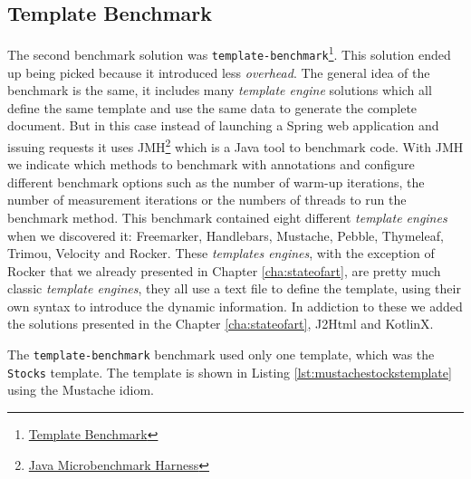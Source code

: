 \subsection{Template Benchmark}
\label{sec:templatebenchmark}

The second benchmark solution was \texttt{template-benchmark}\footnote{\href{https://github.com/mbosecke/template-benchmark}{Template Benchmark}}. This solution ended up being picked because it introduced less \textit{overhead}. The general idea of the benchmark is the same, it includes many \textit{template engine} solutions which all define the same template and use the same data to generate the complete document. But in this case instead of launching a Spring web application and issuing requests it uses \ac{JMH}\footnote{\href{http://openjdk.java.net/projects/code-tools/jmh/}{Java Microbenchmark Harness}} which is a Java tool to benchmark code. With \ac{JMH} we indicate which methods to benchmark with annotations and configure different benchmark options such as the number of warm-up iterations, the number of measurement iterations or the numbers of threads to run the benchmark method. This benchmark contained eight different \textit{template engines} when we discovered it: Freemarker\cite{freemarker}, Handlebars\cite{handlebars}, Mustache\cite{mustache}, Pebble\cite{pebble}, Thymeleaf\cite{thymeleaf}, Trimou\cite{trimou}, Velocity\cite{velocity} and Rocker\cite{rocker}. These \textit{templates engines}, with the exception of Rocker that we already presented in Chapter \ref{cha:stateofart}, are pretty much classic \textit{template engines}, they all use a text file to define the template, using their own syntax to introduce the dynamic information. In addiction to these we added the solutions presented in the Chapter \ref{cha:stateofart}, J2Html and KotlinX. 

\noindent
The \texttt{template-benchmark} benchmark used only one template, which was the \texttt{Stocks} template. The template is shown in Listing \ref{lst:mustachestockstemplate} using the Mustache idiom.

\bigskip


